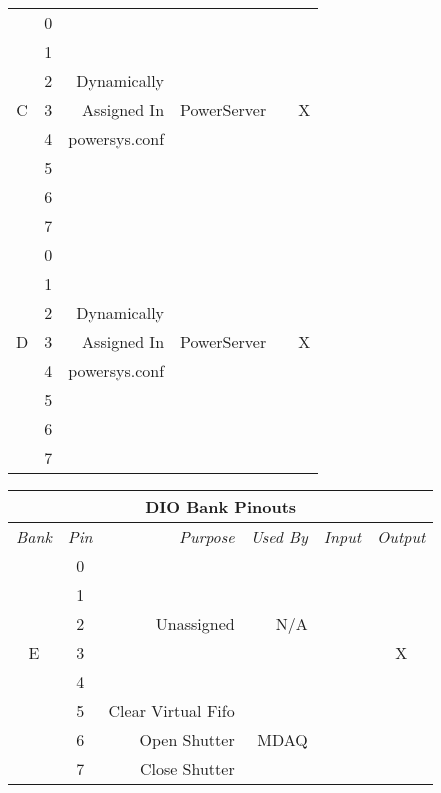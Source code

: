 \begin{tabular}{|c|c|r|r|c|c|}
         & 0      &                  &      &          & \\ \cline{2 - 2}
	 & 1      &                  &      &          & \\ \cline{2 - 2}
	 & 2      & Dynamically      &      &          & \\ \cline{2 - 2}
 C	 & 3      & Assigned In      & PowerServer &   & X \\ \cline{2 - 2}
         & 4      & powersys.conf    &      &          & \\ \cline{2 - 2}
         & 5      &                  &      &          & \\ \cline{2 - 2}
	 & 6      &                  &      &          & \\ \cline{2 - 2}
	 & 7      &                  &      &          & \\ \hline
           
	 & 0      &                  &      &          & \\ \cline{2 - 2}
	 & 1      &                  &      &          & \\ \cline{2 - 2}
	 & 2      & Dynamically      &      &          & \\ \cline{2 - 2}
 D	 & 3      & Assigned In      & PowerServer &   & X \\ \cline{2 - 2}
	 & 4      & powersys.conf    &      &          & \\ \cline{2 - 2}
	 & 5      &                  &      &          & \\ \cline{2 - 2}
	 & 6      &                  &      &          & \\ \cline{2 - 2}
	 & 7      &                  &      &          & \\ \hline
\end{tabular}
\pagebreak

\begin{tabular}{|c|c|r|r|c|c|}\hline
\multicolumn{6}{|c|}{\bf DIO Bank Pinouts}\\ \hline
\it Bank &\it Pin &\it Purpose &\it Used By &\it Input &\it Output \\ \hline\hline

	 & 0      &            &            &          & \\ \cline{2 - 2}
	 & 1      &            &            &          & \\ \cline{2 - 2}
	 & 2      & Unassigned & N/A        &          & \\ \cline{2 - 2}
 E	 & 3      &            &            &          & X \\ \cline{2 - 2}
	 & 4      &            &            &          & \\ \cline{2 - 4}
	 & 5      & Clear Virtual Fifo&     &          & \\ \cline{2 - 3}
	 & 6      & Open Shutter &  MDAQ    &          & \\ \cline{2 - 3}
	 & 7      & Close Shutter &         &          & \\ \hline

\end{tabular}

%
